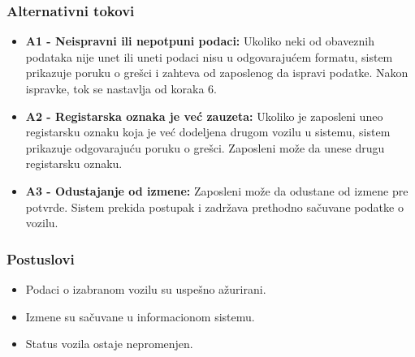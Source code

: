 \subsubsection{Alternativni tokovi}

\begin{itemize}
    \item \textbf{A1 - Neispravni ili nepotpuni podaci:}
    Ukoliko neki od obaveznih podataka nije unet ili uneti podaci nisu u odgovarajućem formatu, sistem prikazuje poruku o grešci i zahteva od zaposlenog da ispravi podatke. Nakon ispravke, tok se nastavlja od koraka 6.

    \item \textbf{A2 - Registarska oznaka je već zauzeta:}
    Ukoliko je zaposleni uneo registarsku oznaku koja je već dodeljena drugom vozilu u sistemu, sistem prikazuje odgovarajuću poruku o grešci. Zaposleni može da unese drugu registarsku oznaku.

    \item \textbf{A3 - Odustajanje od izmene:}
    Zaposleni može da odustane od izmene pre potvrde. Sistem prekida postupak i zadržava prethodno sačuvane podatke o vozilu.
\end{itemize}

\subsubsection{Postuslovi}

\begin{itemize}
    \item Podaci o izabranom vozilu su uspešno ažurirani.
    \item Izmene su sačuvane u informacionom sistemu.
    \item Status vozila ostaje nepromenjen.
\end{itemize}
